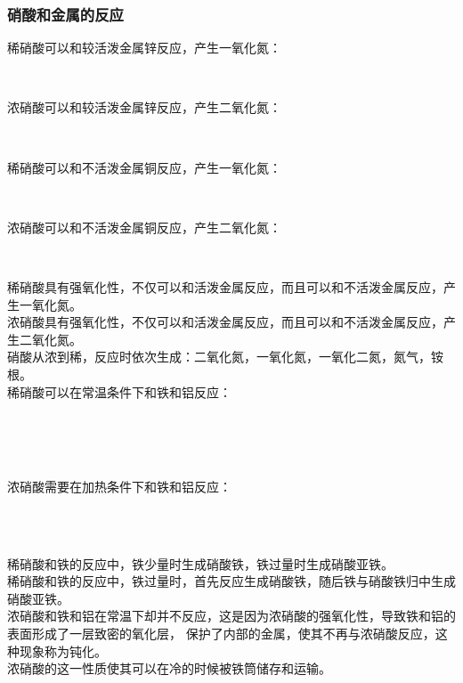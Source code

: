 \documentclass[UTF8]{ctexart}
\begin{document}
\subsubsection{硝酸和金属的反应}
    稀硝酸可以和较活泼金属锌反应，产生一氧化氮：
    \begin{center}
        \\[6mm]
    \end{center}
    浓硝酸可以和较活泼金属锌反应，产生二氧化氮：
    \begin{center}
        \\[6mm]
    \end{center}
    稀硝酸可以和不活泼金属铜反应，产生一氧化氮：
    \begin{center}
        \\[6mm]
    \end{center}
    浓硝酸可以和不活泼金属铜反应，产生二氧化氮：
    \begin{center}
        \\[6mm]
    \end{center}
    稀硝酸具有强氧化性，不仅可以和活泼金属反应，而且可以和不活泼金属反应，产生一氧化氮。\\[3mm]
    浓硝酸具有强氧化性，不仅可以和活泼金属反应，而且可以和不活泼金属反应，产生二氧化氮。\\[3mm]
    硝酸从浓到稀，反应时依次生成：二氧化氮，一氧化氮，一氧化二氮，氮气，铵根。\\[10mm]
    稀硝酸可以在常温条件下和铁和铝反应：
    \begin{center}
        \\[3mm]
        \\[3mm]
        \\[6mm]
    \end{center}
    浓硝酸需要在加热条件下和铁和铝反应：
    \begin{center}
        \\[3mm]
        \\[6mm]
    \end{center}
    稀硝酸和铁的反应中，铁少量时生成硝酸铁，铁过量时生成硝酸亚铁。\\[3mm]
    稀硝酸和铁的反应中，铁过量时，首先反应生成硝酸铁，随后铁与硝酸铁归中生成硝酸亚铁。\\[3mm]
    浓硝酸和铁和铝在常温下却并不反应，这是因为浓硝酸的强氧化性，导致铁和铝的表面形成了一层致密的氧化层，
    保护了内部的金属，使其不再与浓硝酸反应，这种现象称为钝化。\\[3mm]
    浓硝酸的这一性质使其可以在冷的时候被铁筒储存和运输。
\end{document}
